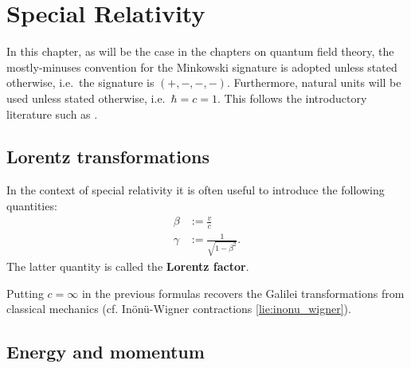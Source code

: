 \chapter{Special Relativity}

    In this chapter, as will be the case in the chapters on quantum field theory, the mostly-minuses convention for the Minkowski signature is adopted unless stated otherwise, i.e.~the signature is $(+,-,-,-)$. Furthermore, natural units will be used unless stated otherwise, i.e.~$\hbar = c = 1$. This follows the introductory literature such as \cite{Peskin, greiner_qft}.

\section{Lorentz transformations}

    \begin{notation}
        In the context of special relativity it is often useful to introduce the following quantities:
        \begin{align}
            \beta &:= \frac{v}{c}\\
            \label{relativity:lorentz_factor}
            \gamma &:= \frac{1}{\sqrt{1 - \beta^2}}.
        \end{align}
        The latter quantity is called the \textbf{Lorentz factor}.
    \end{notation}
    \begin{remark}
        Putting $c=\infty$ in the previous formulas recovers the Galilei transformations from classical mechanics (cf. In\"on\"u-Wigner contractions \ref{lie:inonu_wigner}).
    \end{remark}

\section{Energy and momentum}

